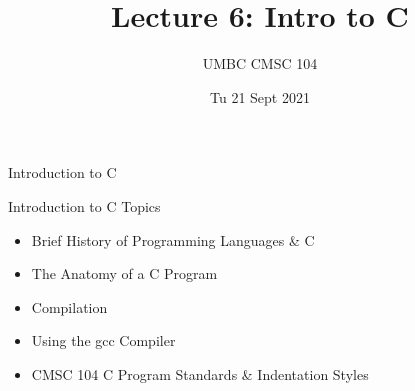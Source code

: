 \documentclass[graphics]{beamer}
\title{Lecture 6: Intro to C}
\author{UMBC CMSC 104}
\date{Tu 21 Sept 2021}
\begin{document}
\begin{frame}{}
\centering
    Introduction to C
\end{frame}

\begin{frame}{Introduction to C}
    Topics
    \begin{itemize}
        \item Brief History of Programming Languages \& C
        \item The Anatomy of a C Program
        \item Compilation
        \item Using the gcc Compiler
        \item CMSC 104 C Program Standards \& Indentation Styles
    \end{itemize}
\end{frame}
\end{document}
